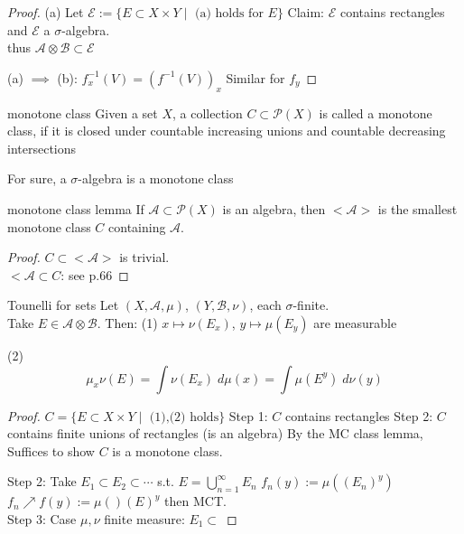 \documentclass[lang=cn,11pt]{elegantbook}
\begin{document}
\begin{proof}
    (a) Let $\mathcal{E}:= \{    E \subset X \times Y \mid \text{ (a) holds for } E  \}$
Claim: $\mathcal{E}$ contains rectangles and $\mathcal{E}$ a $\sigma$-algebra.\\
thus $\mathcal{A} \otimes \mathcal{B} \subset \mathcal{E}$

(a) $\implies$ (b): $f_x^{-1} (V) = (f^{-1}(V) )_x$
    Similar for $f_y$
\end{proof}





\begin{definition}{monotone class}
Given a set $X$, a collection $C \subset \mathcal{P}(X)$ is called a monotone class, if it is closed under countable increasing unions and countable decreasing intersections
\end{definition}
For sure, a $\sigma$-algebra is a monotone class


\begin{lemma}{monotone class lemma}
    If $\mathcal{A} \subset \mathcal{P}(X)$ is an algebra, then $<\mathcal{A>}$ is the smallest monotone class $C$ containing $\mathcal{A}$.
\end{lemma}
\begin{proof}
    $C \subset <\mathcal{A}>$ is trivial.\\
    $<\mathcal{A} \subset C$: see p.66
\end{proof}






\begin{theorem}{Tounelli for sets}
Let $(X,\mathcal{A}, \mu)$, $(Y, \mathcal{B}, \nu)$, each $\sigma$-finite.\\
Take $E \in \mathcal{A} \otimes \mathcal{B}$. Then: 
(1) $x \mapsto \nu(E_x)$, $y \mapsto \mu(E_y)$ are measurable

(2) \[
\mu_x \nu(E) = \int \nu(E_x)  \; d\mu(x) = \int \mu(E^y) \; d \nu(y)
\]
    
\end{theorem}
\begin{proof}
    $C = \{ E \subset X \times Y \mid \text{ (1),(2) holds}\}$
    Step 1: $C$ contains rectangles
    Step 2: $C$ contains finite unions of rectangles  (is an algebra)
  By the MC class lemma, Suffices to show $C$ is a monotone class.

  Step 2: Take $E_1 \subset E_2 \subset \cdots $ s.t. $E = \bigcup_{n=1}^\infty E_n$
$f_n(y) := \mu((E_n)^y)$
$f_n \nearrow f(y) := \mu()(E)^y$
then MCT.\\
Step 3: Case $\mu,\nu$ finite measure: $E_1 \subset$
\end{proof}
\end{document}
